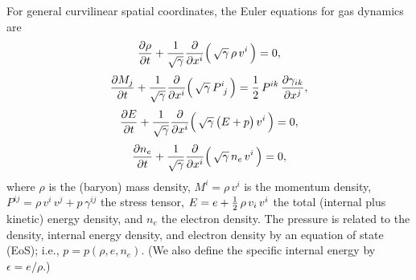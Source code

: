 \documentclass[10pt,preprint]{aastex}
\begin{document}
For general curvilinear spatial coordinates, the Euler equations for gas dynamics are \citep{landauLifshitz_1959}
\begin{equation}
  \frac{\partial \rho}{\partial t}
  +\frac{1}{\sqrt{\gamma}}\frac{\partial }{\partial x^{i}}\Big(\,\sqrt{\gamma}\,\rho\,v^{i}\,\Big)=0,
\end{equation}
\begin{equation}
  \frac{\partial M_{j}}{\partial t}
  +\frac{1}{\sqrt{\gamma}}\frac{\partial }{\partial x^{i}}\Big(\,\sqrt{\gamma}\,P^{i}_{~j}\,\Big)=\frac{1}{2}\,P^{ik}\,\frac{\partial \gamma_{ik}}{\partial x^{j}},
\end{equation}
\begin{equation}
  \frac{\partial E}{\partial t}
  +\frac{1}{\sqrt{\gamma}}\frac{\partial }{\partial x^{i}}\Big(\,\sqrt{\gamma}\,\big(E+p\big)\,v^{i}\,\Big)=0,
\end{equation}
\begin{equation}
  \frac{\partial n_{e}}{\partial t}
  +\frac{1}{\sqrt{\gamma}}\frac{\partial }{\partial x^{i}}\Big(\,\sqrt{\gamma}\,n_{e}\,v^{i}\,\Big)=0,
\end{equation}
where $\rho$ is the (baryon) mass density, $M^{i}=\rho\,v^{i}$ is the momentum density, $P^{ij}=\rho\,v^{i}\,v^{j}+p\,\gamma^{ij}$ the stress tensor, $E=e+\frac{1}{2}\,\rho\,v_{i}\,v^{i}$ the total (internal plus kinetic) energy density, and $n_{e}$ the electron density.  
The pressure is related to the density, internal energy density, and electron density by an equation of state (EoS); i.e., $p=p(\rho,e,n_{e})$.  
(We also define the specific internal energy by $\epsilon=e/\rho$.)
\end{document}
